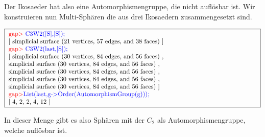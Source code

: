 \documentclass[12pt,titlepage,twoside,cleardoublepage]{article}
\theoremstyle{nummermitklammern}
\numberwithin{equation}{section}
\begin{document}
Der Ikosaeder hat also eine Automorphismengruppe, die nicht auflösbar ist. Wir konstruieren nun Multi-Sphären die aus drei Ikosaedern zusammengesetzt sind.
\begin{center}
$\fbox{
\parbox{14cm}{
\textcolor{red}{gap$>$} \textcolor{blue}{C3W2([S],[S]);}\newline
[ simplicial surface (21 vertices, 57 edges, and 38 faces)
 ]\newline
\textcolor{red}{gap$>$} \textcolor{blue}{C3W2(last,[S]);}\newline
[ simplicial surface (30 vertices, 84 edges, and 56 faces)
    ,\newline simplicial surface (30 vertices, 84 edges, and 56 faces)
    , \newline simplicial surface (30 vertices, 84 edges, and 56 faces)
    ,\newline simplicial surface (30 vertices, 84 edges, and 56 faces)
    ,\newline
  simplicial surface (30 vertices, 84 edges, and 56 faces)
 ]\newline
\textcolor{red}{gap$>$}\textcolor{blue}{ List(last,g-$>$Order(AutomorphismGroup(g)));}\newline
[ 4, 2, 2, 4, 12 ]
}}$
\end{center}
In dieser Menge gibt es also Sphären mit der $C_2$ als Automorphismengruppe, welche auflösbar ist.
\end{document}
